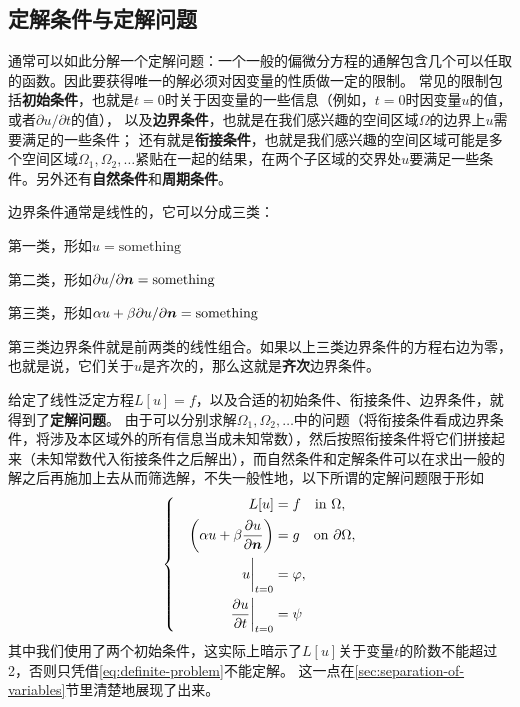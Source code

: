 \documentclass[UTF8]{ctexart}
\newenvironment{bigcase}{\left\{ \quad \begin{aligned}}{\end{aligned}\right.}
\renewenvironment{enumerate}{\begin{compactenum}}{\end{compactenum}}
\begin{document}
\subsection{定解条件与定解问题}\label{sec:definite-problem}

通常可以如此分解一个定解问题：一个一般的偏微分方程的通解包含几个可以任取的函数。因此要获得唯一的解必须对因变量的性质做一定的限制。
常见的限制包括\textbf{初始条件}，也就是$t=0$时关于因变量的一些信息（例如，$t=0$时因变量$u$的值，或者$\partial u / \partial t$的值），
以及\textbf{边界条件}，也就是在我们感兴趣的空间区域$\Omega$的边界上$u$需要满足的一些条件；
还有就是\textbf{衔接条件}，也就是我们感兴趣的空间区域可能是多个空间区域$\Omega_1, \Omega_2, \ldots$紧贴在一起的结果，在两个子区域的交界处$u$要满足一些条件。另外还有\textbf{自然条件}和\textbf{周期条件}。

边界条件通常是线性的，它可以分成三类：
\begin{enumerate}
    \item 第一类，形如$u = \text{something}$
    \item 第二类，形如$\partial u / \partial \vb*{n} = \text{something}$
    \item 第三类，形如$\alpha u + \beta \partial u / \partial \vb*{n} = \text{something}$
\end{enumerate}
第三类边界条件就是前两类的线性组合。如果以上三类边界条件的方程右边为零，也就是说，它们关于$u$是齐次的，那么这就是\textbf{齐次}边界条件。

给定了线性泛定方程$L[u]=f$，以及合适的初始条件、衔接条件、边界条件，就得到了\textbf{定解问题}。
由于可以分别求解$\Omega_1, \Omega_2,\ldots$中的问题（将衔接条件看成边界条件，将涉及本区域外的所有信息当成未知常数），然后按照衔接条件将它们拼接起来（未知常数代入衔接条件之后解出），而自然条件和定解条件可以在求出一般的解之后再施加上去从而筛选解，不失一般性地，以下所谓的定解问题限于形如
\begin{equation}
    \begin{bigcase}
        L[u] &= f \quad \text{in $\Omega$}, \\
        \left(\alpha u + \beta \pdv{u}{\vb*{n}} \right) &= g \quad \text{on $\partial \Omega$}, \\
        \eval{u}_{t=0} &= \varphi, \\
        \eval{\pdv{u}{t}}_{t=0} &= \psi
    \end{bigcase}
    \label{eq:definite-problem}
\end{equation}
其中我们使用了两个初始条件，这实际上暗示了$L[u]$关于变量$t$的阶数不能超过2，否则只凭借\eqref{eq:definite-problem}不能定解。
这一点在\ref{sec:separation-of-variables}节里清楚地展现了出来。
\end{document}
